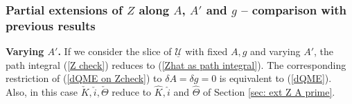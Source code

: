 \documentclass[11pt,a4paper]{amsart}
\theoremstyle{plain} %
\theoremstyle{definition}
\theoremstyle{remark}
\newtheorem{rem}[thm]{Remark}
\newcommand{\mr}{\mathrm}
\newcommand{\ra}{\rightarrow}
\newcommand{\wh}{\widehat}
\newcommand{\mc}{\mathcal}
\newcommand{\UU}{\underline{\mc{U}}}
\newcommand{\ul}{\underline}
\begin{document}
{

\subsubsection{Partial extensions of $Z$ along $A$, $A'$ and $g$ -- comparison with previous results}\leavevmode

\textbf{Varying $A'$.}
    If we consider the slice of $\UU$ with fixed $A,g$ and varying $A'$, 
    the path integral (\ref{Z check}) reduces to (\ref{Zhat as path integral}). The corresponding restriction of (\ref{dQME on Zcheck}) to $\delta A=\delta g=0$ is equivalent to (\ref{dQME}). Also, in this case $\check{K},\check{i},\check\Theta$ reduce to $\wh{K},\wh{i}$ and $\wh\Theta$ of Section \ref{sec: ext Z A prime}.
    
}
\end{document}
